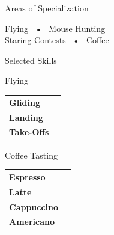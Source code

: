 \documentclass[lightstylish]{stylishcv} %
\begin{document}
		\begin{center}
			\begin{darkshadedcvbox}Areas of Specialization\end{darkshadedcvbox}
		\end{center}
		{\footnotesize \begin{center}Flying ~•~ Mouse Hunting\\ Staring Contests ~•~ Coffee\end{center}}
		\smallskip
		\vspace{-0.25cm}



		\begin{darkshadedcvbox}Selected Skills\end{darkshadedcvbox}

		\begin{center}\begin{shadedcvbox}Flying\end{shadedcvbox}\end{center}
		\begin{tabular}{L{1.35cm} r}
			\hspace{-0.45cm}\textbf{Gliding} & \\
			\hspace{-0.45cm}\textbf{Landing} &  \\
			\hspace{-0.45cm}\textbf{Take-Offs} &  \\
		\end{tabular}
		\smallskip

		\begin{center}\begin{shadedcvbox}Coffee Tasting\end{shadedcvbox}\end{center}
		\begin{tabular}{L{1.35cm} r}
			\hspace{-0.45cm}\textbf{Espresso} & \\
			\hspace{-0.45cm}\textbf{Latte} &  \\
			\hspace{-0.45cm}\textbf{Cappuccino} &  \\
			\hspace{-0.45cm}\textbf{Americano} &  \\
		\end{tabular}
\end{document}
